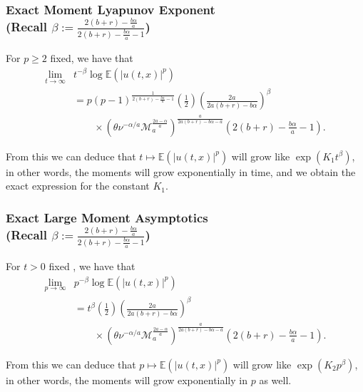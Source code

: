 \documentclass{beamer}%
\numberwithin{equation}{section}
\newcommand{\E}{\mathbb{E}}
\begin{document}
	\begin{frame}[t]%
		\frametitle{Exact Moment Lyapunov Exponent \\
			\small (Recall $\beta := \frac{2(b+r)-\frac{b\alpha}{a}}{ 2(b+r)-\frac{b\alpha}{a} -1}$)}
		\begin{corollary}
			For $p \ge 2$ fixed, we have that
			\begin{align*}
			\lim_{t \to \infty} & t^{-\beta} \log \E\left(|u(t,x)|^p\right)                                                                                 \\
			& =  p(p-1)^{\frac{1}{2(b+r)-\frac{b\alpha}{a} -1}} \left(\frac{1}{2}\right)\left(\frac{2a}{2a(b+r)- b\alpha} \right)^\beta \\
			& \quad \quad \times \left(\theta\nu^{-\alpha/a} \mathcal{M}_a^{\frac{2a-\alpha}{a}}\right)^{\frac{a}{2a(b+r)-b\alpha-a}}\left(2(b+r)-\frac{b\alpha}{a}-1\right).
			\end{align*}
		\end{corollary}
		\vfill
		
		From this we can deduce that $t \mapsto \mathbb{E}(|u(t,x)|^p)$ will grow like $\exp\left({K_1 t^\beta }\right)$, in other words, the moments will grow exponentially in time,
		and we obtain the exact expression for the constant $K_1$.
	\end{frame}%
	
	\begin{frame}[t]%
		\frametitle{Exact Large Moment Asymptotics \\
			\small (Recall $\beta := \frac{2(b+r)-\frac{b\alpha}{a}}{ 2(b+r)-\frac{b\alpha}{a} -1}$)}
		\begin{corollary} For $t>0$ fixed , we have that
			\begin{align*}
			\lim_{p \to \infty} & p^{-\beta} \log \E\left(|u(t,x)|^p\right)                                          \\
			& =  t^\beta \left(\frac{1}{2}\right)\left(\frac{2a}{2a(b+r)- b\alpha} \right)^\beta \\
			& \quad \quad \times \left(\theta\nu^{-\alpha/a} \mathcal{M}_a^{\frac{2a-\alpha}{a}}\right)^{\frac{a}{2a(b+r)-b\alpha-a}}\left(2(b+r)-\frac{b\alpha}{a}-1\right).
			\end{align*}
		\end{corollary}
		\vfill
		
		From this we can deduce that $p \mapsto \mathbb{E}(|u(t,x)|^p)$ will grow like $\exp\left({K_2 p^\beta }\right)$, in other words, the moments will grow exponentially in $p$ as well.
		
	\end{frame}%
	
\end{document}
